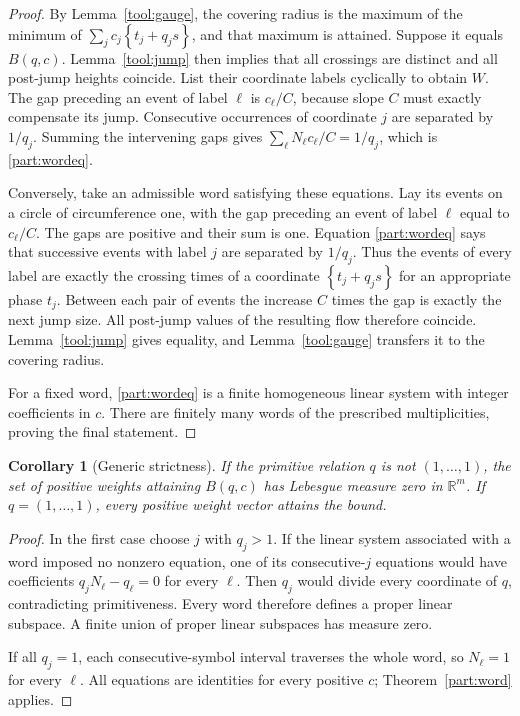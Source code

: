 \documentclass[11pt,a4paper]{article}
\newtheorem{corollary}[theorem]{Corollary}
\theoremstyle{remark}\newtheorem{remark}[theorem]{Remark}
\newcommand{\R}{\mathbb R}\newcommand{\Z}{\mathbb Z}
\newcommand{\fr}[1]{\left\{#1\right\}}\newcommand{\one}{\mathbf1}
\begin{document}
\begin{proof}
By Lemma~\ref{tool:gauge}, the covering radius is the maximum of
the minimum of $\sum_jc_j\fr{t_j+q_js}$, and that maximum is
attained.  Suppose it equals $B(q,c)$.  Lemma~\ref{tool:jump}
then implies that all crossings are distinct and all post-jump
heights coincide.  List their coordinate labels cyclically to
obtain $W$.  The gap preceding an event of label $\ell$ is
$c_\ell/C$, because slope $C$ must exactly compensate its jump.
Consecutive occurrences of coordinate $j$ are separated by
$1/q_j$.  Summing the intervening gaps gives
$\sum_\ell N_\ell c_\ell/C=1/q_j$, which is
\eqref{part:wordeq}.

Conversely, take an admissible word satisfying these equations.
Lay its events on a circle of circumference one, with the gap
preceding an event of label $\ell$ equal to $c_\ell/C$.
The gaps are positive and their sum is one.  Equation
\eqref{part:wordeq} says that successive events with label $j$
are separated by $1/q_j$.  Thus the events of every label are
exactly the crossing times of a coordinate
$\fr{t_j+q_js}$ for an appropriate phase $t_j$.
Between each pair of events the increase $C$ times the gap is
exactly the next jump size.  All post-jump values of the resulting
flow therefore coincide.  Lemma~\ref{tool:jump} gives equality,
and Lemma~\ref{tool:gauge} transfers it to the covering radius.

For a fixed word, \eqref{part:wordeq} is a finite homogeneous
linear system with integer coefficients in $c$.  There are finitely
many words of the prescribed multiplicities, proving the final
statement.
\end{proof}

\begin{corollary}[Generic strictness]\label{part:measurezero}
If the primitive relation $q$ is not $(1,\ldots,1)$, the set of
positive weights attaining $B(q,c)$ has Lebesgue measure zero in
$\R^m$.  If $q=(1,\ldots,1)$, every positive weight vector
attains the bound.
\end{corollary}

\begin{proof}
In the first case choose $j$ with $q_j>1$.  If the linear system
associated with a word imposed no nonzero equation, one of its
consecutive-$j$ equations would have coefficients
$q_jN_\ell-q_\ell=0$ for every $\ell$.  Then $q_j$ would divide
every coordinate of $q$, contradicting primitiveness.  Every word
therefore defines a proper linear subspace.  A finite union of
proper linear subspaces has measure zero.

If all $q_j=1$, each consecutive-symbol interval traverses the
whole word, so $N_\ell=1$ for every $\ell$.  All equations are
identities for every positive $c$; Theorem~\ref{part:word} applies.
\end{proof}
\end{document}
